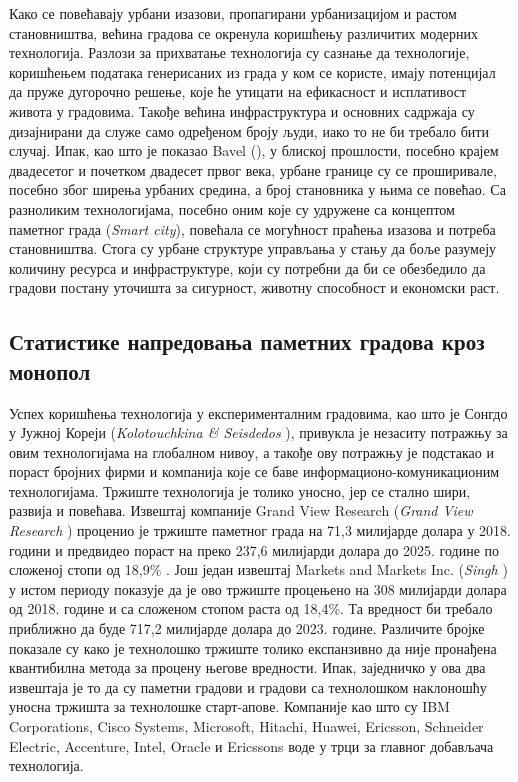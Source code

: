 \documentclass{article}
\begin{document}
Како се повећавају урбани изазови, пропагирани урбанизацијом и растом становништва, већина градова се окренула коришћењу различитих модерних технологија. Разлози за прихватање технологија су сазнање да технологије, коришћењем података генерисаних из града у ком се користе, имају потенцијал да пруже дугорочно решење, које ће утицати на ефикасност и исплативост живота у градовима. Такође већина инфраструктура и основних садржаја су дизајнирани да служе само одређеном броју људи, иако то не би требало бити случај. Ипак, као што је показао Bavel (\cite{b_2013}), у блиској прошлости, посебно крајем двадесетог и почетком двадесет првог века, урбане границе су се проширивале, посебно због ширења урбаних средина, а број становника у њима се повећао. Са разноликим технологијама, посебно оним које су удружене са концептом паметног града (\textit{Smart city}), повећала се могућност праћења изазова и потреба становништва. Стога су урбане структуре управљања у стању да боље разумеју количину ресурса и инфраструктуре, који су потребни да би се обезбедило да градови постану уточишта за сигурност, животну способност и економски раст.

\subsection{Статистике напредовања паметних градова кроз монопол}
Успех коришћења технологија у експерименталним градовима, као што је Сонгдо у Јужној Кореји (\textit{Kolotouchkina & Seisdedos} \cite{2017}), привукла је незаситу потражњу за овим технологијама на глобалном нивоу, а такође ову потражњу је подстакао и пораст бројних фирми и компанија које се баве информационо-комуникационим технологијама. Тржиште технологија је толико уносно, јер се стално шири, развија и повећава. Извештај компаније Grand View Research (\textit{Grand View Research} \cite{2019}) проценио је тржиште паметног града на 71,3 милијарде долара у 2018. години и предвидео пораст на преко 237,6 милијарди долара до 2025. године по сложеној стопи од 18,9\% . Још један извештај Markets and Markets Inc. (\textit{Singh} \cite{s2019}) у истом периоду показује да је ово тржиште процењено на 308 милијарди долара од 2018. године и са сложеном стопом раста од 18,4\%. Та вредност би требало приближно да буде 717,2 милијарде долара до 2023. године. Различите бројке показале су како је технолошко тржиште толико експанзивно да није пронађена квантибилна метода за процену његове вредности. Ипак, заједничко у ова два извештаја је то да су паметни градови и градови са технолошком наклоношћу уносна тржишта за технолошке старт-апове. Компаније као што су IBM Corporations, Cisco Systems, Microsoft, Hitachi, Huawei, Ericsson, Schneider Electric, Accenture, Intel, Oracle и Ericssons воде у трци за главног добављача технологија. 
\end{document}
